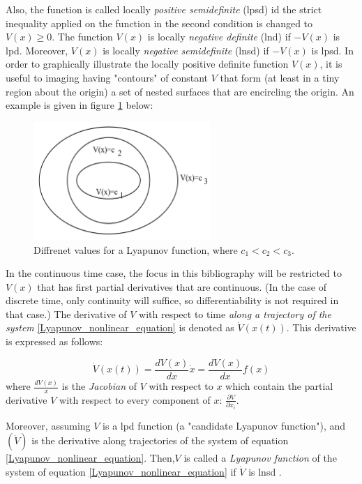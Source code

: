 \documentclass{thesisreport}
\begin{document}
Also, the function is called locally \textit{positive semidefinite} (lpsd) id the strict inequality applied on the function in the second condition is changed to $V(x) \geq 0$. The function $V(x)$ is locally \textit{negative definite} (lnd) if $-V(x)$ is lpd. Moreover, $V(x)$ is locally \textit{negative semidefinite} (lnsd) if $-V(x)$ is lpsd. In order to graphically illustrate the locally positive definite function $V(x)$, it is useful to imaging having "contours" of constant $V$ that form (at least in a tiny region about the origin) a set of nested surfaces that are encircling the origin. An example is given in figure \ref{Lyapunov_figure} below: 


\begin{figure}[h]
\centering
\includegraphics[width=0.6\textwidth]{Images/Control/Lyapunov_function}
\caption{Diffrenet values for a Lyapunov function, where $c_1<c_2<c_3$. \cite{Dahleh2011}}
\label{Lyapunov_figure}
\end{figure}

In the continuous time case, the focus in this bibliography will be restricted to $V(x)$ that has first partial derivatives that are continuous. (In the case of discrete time, only continuity will suffice, so differentiability is not required in that case.) The derivative of $V$ with respect to time \textit{along a trajectory of the system} \ref{Lyapunov_nonlinear_equation} is denoted as $\dot{V}(x(t))$. This derivative is expressed as follows:

\begin{equation}
\dot{V}(x(t)) = \frac{dV(x)}{dx}\dot{x} = \frac{dV(x)}{dx}f(x)
\end{equation}
where 
$\frac{dV(x)}{x}$ is the \textit{Jacobian} of $V$ with respect to $x$ which contain the partial derivative $V$ with respect to every component of $x$: $\frac{\partial V}{\partial x_i}$.

Moreover, assuming $V$ is a lpd function (a "candidate Lyapunov function"), and $(\dot{V})$ is the derivative along trajectories of the system of equation \ref{Lyapunov_nonlinear_equation}. Then,$V$ is called a \textit{Lyapunov function} of the system of equation \ref{Lyapunov_nonlinear_equation} if $\dot{V}$ is lnsd \cite{Dahleh2011}.
\end{document}
